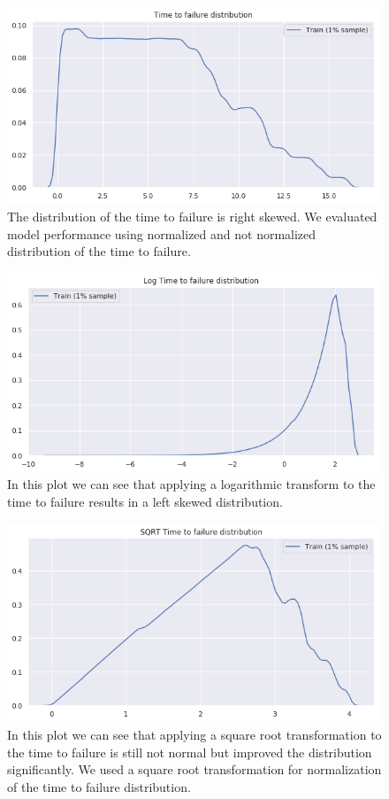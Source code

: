 \documentclass[]{llncs} %
\begin{document}
\begin{figure}
	\centering
	\includegraphics[width=.9\linewidth]{timeToFailureDistribution}
	\caption{The distribution of the time to failure is right skewed. We evaluated model performance using normalized and not normalized distribution of the time to failure.}
	\label{fig:timeToFailureDistribution}
\end{figure}
\begin{figure}
	\centering
	\includegraphics[width=.9\linewidth]{logTimeToFailureDistribution}
	\caption{In this plot we can see that applying a logarithmic transform to the time to failure results in a left skewed distribution.}
	\label{fig:logTimeToFailureDistribution}
\end{figure}
\begin{figure}
	\centering
	\includegraphics[width=.9\linewidth]{sqrtTimeToFailureDistribution}
	\caption{In this plot we can see that applying a square root transformation to the time to failure is still not normal but improved the distribution significantly. We used a square root transformation for normalization of the time to failure distribution.}
	\label{fig:sqrtTimeToFailureDistribution}
\end{figure}
\clearpage
\newpage
\end{document}
